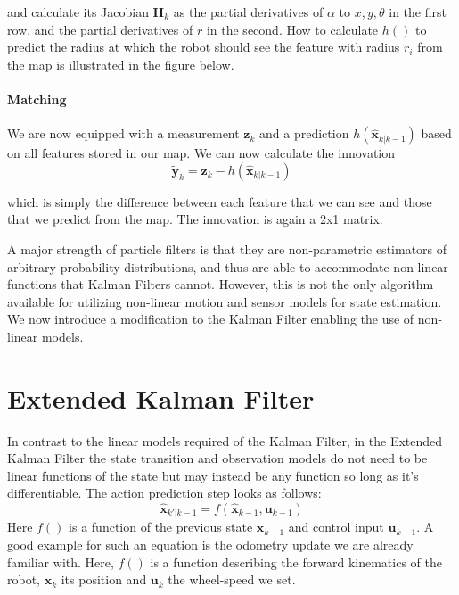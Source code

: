 and calculate its Jacobian $ \boldsymbol{H}_{k}$ as the partial derivatives of $ \alpha$ to $ x,y,\theta$ in the first row, and the partial derivatives of $ r$ in the second. How to calculate $ h()$ to predict the radius at which the robot should see the feature with radius $ r_i$ from the map is illustrated in the figure below.



\paragraph{Matching}
We are now equipped with a measurement $ \boldsymbol{z}_k$ and a prediction $ h(\hat{\boldsymbol{x}}_{k|k-1})$ based on all features stored in our map. We can now calculate the innovation
\begin{equation}
\tilde{\boldsymbol{y}}_{k}=\boldsymbol{z}_{k}-h(\hat{\boldsymbol{x}}_{k|k-1})
\end{equation}

which is simply the difference between each feature that we can see and those that we predict from the map. The innovation is again a 2x1 matrix.

A major strength of particle filters is that they are non-parametric estimators of arbitrary probability distributions, and thus are able to accommodate non-linear functions that Kalman Filters cannot. However, this is not the only algorithm available for utilizing non-linear motion and sensor models for state estimation. We now introduce a modification to the Kalman Filter enabling the use of non-linear models.


\section{Extended Kalman Filter}\label{sec:EKF}
In contrast to the linear models required of the Kalman Filter, in the Extended Kalman Filter the state transition and observation models do not need to be linear functions of the state but may instead be any function so long as it's differentiable. The action prediction step looks as follows:
\begin{equation}
\hat{\boldsymbol{x}}_{k'|k-1} = f(\hat{\boldsymbol{x}}_{k-1}, \boldsymbol{u}_{k-1})
\end{equation}
Here $ f()$ is a function of the previous state $ \boldsymbol{x}_{k-1}$ and control input $ \boldsymbol{u}_{k-1}$. A good example for such an equation is the odometry update we are already familiar with. Here, $ f()$ is a function describing the forward kinematics of the robot, $ \boldsymbol{x}_k$ its position and $ \boldsymbol{u}_k$ the wheel-speed we set.

